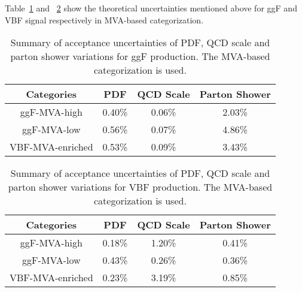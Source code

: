 Table~\ref{tab:acc-ggF-dnn} and ~\ref{tab:acc-VBF-dnn} show the theoretical uncertainties mentioned above for ggF and VBF signal respectively in MVA-based categorization.

\begin{table}[htbp]
  \centering
  \caption{Summary of acceptance uncertainties of PDF, QCD scale and parton shower variations for ggF production. The MVA-based categorization is used.}
  \label{tab:acc-ggF-dnn}
  \begin{spacing}{0.75}
  \begin{tabular}{cccc}
    \toprule
    Categories  & PDF    & QCD Scale  & Parton Shower \\
    \midrule
    ggF-MVA-high  & 0.40\% & 0.06\% & 2.03\% \\
    ggF-MVA-low   & 0.56\% & 0.07\% & 4.86\% \\
    VBF-MVA-enriched  & 0.53\% & 0.09\% & 3.43\% \\
    \bottomrule
  \end{tabular}
  \end{spacing}
\end{table}

\begin{table}[htbp]
  \centering
  \caption{Summary of acceptance uncertainties of PDF, QCD scale and parton shower variations for VBF production. The MVA-based categorization is used.}
  \label{tab:acc-VBF-dnn}
  \begin{spacing}{0.75}
  \begin{tabular}{cccc}
    \toprule
    Categories  & PDF    & QCD Scale  & Parton Shower \\
    \midrule
    ggF-MVA-high  & 0.18\% & 1.20\% & 0.41\% \\
    ggF-MVA-low   & 0.43\% & 0.26\% & 0.36\% \\
    VBF-MVA-enriched  & 0.23\% & 3.19\% & 0.85\% \\
    \bottomrule
  \end{tabular}
  \end{spacing}
\end{table}

